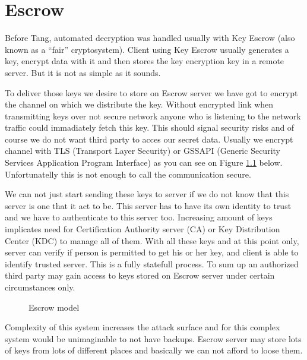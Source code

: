\documentclass[../xdudla00-porting-Tang-to-Open-WRT.tex]{subfiles}
\begin{document}
\chapter{Escrow}\label{escrow}
Before Tang, automated decryption was handled usually with Key Escrow \cite{escrow} (also known as a “fair” cryptosystem).
Client using Key Escrow usually generates a key, encrypt data with it and then stores the key encryption key in a remote server.
But it is not as simple as it sounds.

To deliver those keys we desire to store on Escrow server we have got to encrypt the channel on which we distribute the key.
Without encrypted link when transmitting keys over not secure network anyone who is listening to the network traffic could immadiately fetch this key.
This should signal security risks and of course we do not want third party to acces our secret data.
Usually we encrypt channel with TLS \cite{tls}(Transport Layer Security) or GSSAPI \cite{gssapi}
 (Generic Security Services Application Program Interface) as you can see on Figure \ref{fig:escrowmodel} below.
Unfortunatelly this is not enough to call the communication secure.

We can not just start sending these keys to server if we do not know that this server is one that it act to be.
This server has to have its own identity to trust and we have to authenticate to this server too.
Increasing amount of keys implicates need for Certification Authority server (CA)\cite{ca} or Key Distribution Center (KDC) \cite{kdc} to manage all of them.
With all these keys and at this point only, server can verify if person is permitted to get his or her key, and client is able to identify trusted server.
This is a fully statefull process.
To sum up an authorized third party may gain access to keys stored on Escrow server under certain circumstances only.

\begin{figure}[h]
    \centering
    \caption{Escrow model}
    \label{fig:escrowmodel}
\end{figure}

Complexity of this system increases the attack surface and for this complex system would be unimaginable to not have backups.
Escrow server may store lots of keys from lots of different places and basically we can not afford to loose them.
\end{document}
